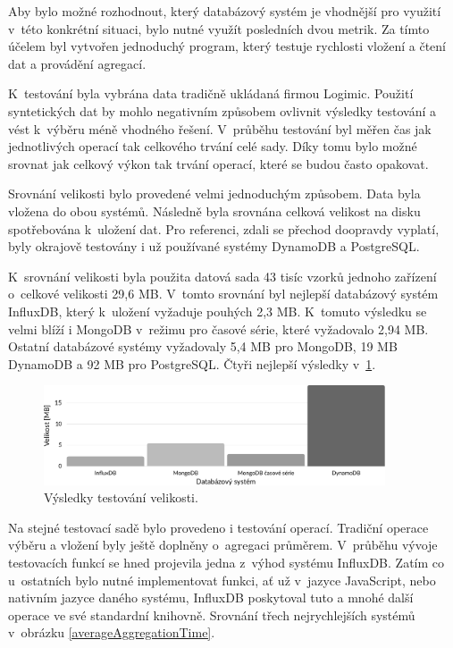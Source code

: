 Aby bylo možné rozhodnout, který databázový systém je vhodnější pro využití v~této konkrétní situaci, bylo nutné využít posledních dvou metrik. Za tímto účelem byl vytvořen jednoduchý program, který testuje rychlosti vložení a čtení dat a provádění agregací. 

K~testování byla vybrána data tradičně ukládaná firmou Logimic. Použití syntetických dat by mohlo negativním způsobem ovlivnit výsledky testování a vést k~výběru méně vhodného řešení. V~průběhu testování byl měřen čas jak jednotlivých operací tak celkového trvání celé sady. Díky tomu bylo možné srovnat jak celkový výkon tak trvání operací, které se budou často opakovat.

Srovnání velikosti bylo provedené velmi jednoduchým způsobem. Data byla vložena do obou systémů. Následně byla srovnána celková velikost na disku spotřebována k~uložení dat. Pro referenci, zdali se přechod doopravdy vyplatí, byly okrajově testovány i už používané systémy DynamoDB a PostgreSQL. 

K~srovnání velikosti byla použita datová sada 43 tisíc vzorků jednoho zařízení o~celkové velikosti 29,6 MB. V~tomto srovnání byl nejlepší databázový systém InfluxDB, který k~uložení vyžaduje pouhých 2,3 MB. K~tomuto výsledku se velmi blíží i MongoDB v~režimu pro časové série, které vyžadovalo 2,94 MB. Ostatní databázové systémy vyžadovaly 5,4 MB pro MongoDB, 19 MB DynamoDB a 92 MB pro PostgreSQL. Čtyři nejlepší výsledky v~\ref{size}.

\begin{figure}[H]
\label{size}
\begin{center}
    \includegraphics[width=0.9\textwidth]{obrazky-figures/size.pdf}
\end{center}
\caption{Výsledky testování velikosti.}
\end{figure}

Na stejné testovací sadě bylo provedeno i testování operací. Tradiční operace výběru a vložení byly ještě doplněny o~agregaci průměrem. V~průběhu vývoje testovacích funkcí se hned projevila jedna z~výhod systému InfluxDB. Zatím co u~ostatních bylo nutné implementovat funkci, ať už v~jazyce JavaScript, nebo nativním jazyce daného systému, InfluxDB poskytoval tuto a mnohé další operace ve své standardní knihovně. Srovnání třech nejrychlejších systémů v~obrázku \ref{averageAggregationTime}.

